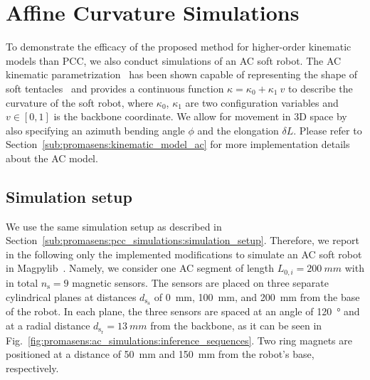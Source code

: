 \section{Affine Curvature Simulations}\label{sec:promasens:ac_simulations}
To demonstrate the efficacy of the proposed method for higher-order kinematic models than \gls{PCC}, we also conduct simulations of an \gls{AC} soft robot.
The \gls{AC} kinematic parametrization~\citep{della2020soft} has been shown capable of representing the shape of soft tentacles~\citep{stella2022experimental, stella2023piecewise} and provides a continuous function $\kappa = \kappa_0 + \kappa_1 \: v$ to describe the curvature of the soft robot, where $\kappa_0$, $\kappa_1$ are two configuration variables and $v \in [0, 1]$ is the backbone coordinate. We allow for movement in 3D space by also specifying an azimuth bending angle $\phi$ and the elongation $\delta L$.
Please refer to Section~\ref{sub:promasens:kinematic_model_ac} for more implementation details about the \gls{AC} model.


\subsection{Simulation setup}\label{sub:promasens:ac_simulations:simulation_setup}
We use the same simulation setup as described in Section~\ref{sub:promasens:pcc_simulations:simulation_setup}. 
Therefore, we report in the following only the implemented modifications to simulate an \gls{AC} soft robot in Magpylib~\citep{magpylib2020}.
Namely, we consider one \gls{AC} segment of length $L_{0,i} = \SI{200}{mm}$ with in total $n_\mathrm{s} = 9$ magnetic sensors. 
The sensors are placed on three separate cylindrical planes at distances $d_{\mathrm{s}_\mathrm{a}}$ of \SI{0}{mm}, \SI{100}{mm}, and \SI{200}{mm} from the base of the robot. In each plane, the three sensors are spaced at an angle of \SI{120}{\degree} and at a radial distance $d_{\mathrm{s}_\mathrm{r}} = \SI{13}{mm}$ from the backbone, as it can be seen in Fig.~\ref{fig:promasens:ac_simulations:inference_sequences}.
Two ring magnets are positioned at a distance of \SI{50}{mm} and \SI{150}{mm} from the robot's base, respectively.

